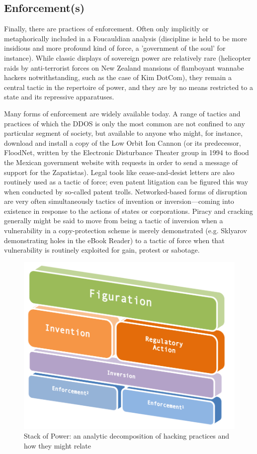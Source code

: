 \documentclass[10pt,letter,oneside]{scrartcl}
\begin{document}
\subsection*{Enforcement(s)}

Finally, there are practices of enforcement. Often only implicitly or
metaphorically included in a Foucauldian analysis (discipline is held to be
more insidious and more profound kind of force, a 'government of the soul' for
instance).  While classic displays of sovereign power are relatively rare
(helicopter raids by anti-terrorist forces on New Zealand mansions of
flamboyant wannabe hackers notwithstanding, such as the case of Kim DotCom), 
they remain a central tactic in the repertoire of power, and they are by no means
restricted to a state and its repressive apparatuses.

Many forms of enforcement are widely available today.  A range of tactics and
practices of which the DDOS is only the most common are not confined to any
particular segment of society, but available to anyone who might, for instance,
download and install a copy of the Low Orbit Ion Cannon (or its predecessor,
FloodNet, written by the Electronic Disturbance Theater group in 1994 to flood
the Mexican government website with requests in order to send a message of
support for the Zapatistas).  Legal tools like cease-and-desist letters are also
routinely used as a tactic of force; even patent litigation can be figured this
way when conducted by so-called patent trolls.  Networked-based forms of
disruption are very often simultaneously tactics of invention or
inversion—coming into existence in response to the actions of states or
corporations.  Piracy and cracking generally might be said to move from being a
tactic of inversion when a vulnerability in a copy-protection scheme is merely
demonstrated (e.g. Sklyarov demonstrating holes in the eBook Reader) to a tactic
of force when that vulnerability is routinely exploited for gain, protest or
sabotage.

\begin{figure} \centering \includegraphics[scale=0.5]{images/protocolstackV2}
\caption{Stack of Power: an analytic decomposition of hacking
practices and how they might relate} \label{fig:ProtocolStack} \end{figure}
\end{document}
